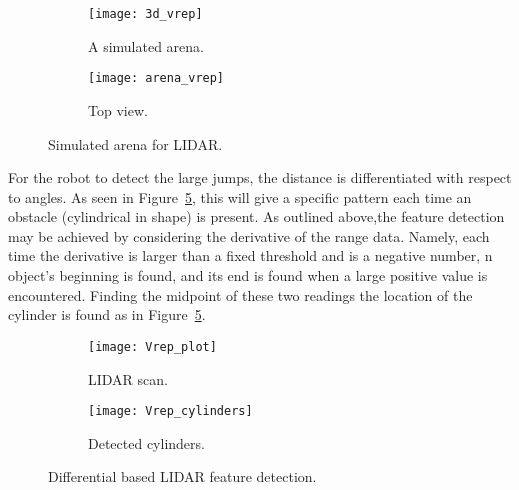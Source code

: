 \begin{figure}[h!]
    \centering
    \begin{subfigure}[b]{0.3\textwidth}
    
	    \texttt{[image: 3d\_vrep]}
	    \caption{A simulated arena.}
	    \label{fig:3d_vrep}
    \end{subfigure}
    \quad %
    \begin{subfigure}[b]{0.3\textwidth}
        \texttt{[image: arena\_vrep]}
        \caption{Top view.}
        \label{fig:arena_vrep}
    \end{subfigure}%
        \caption{Simulated arena for LIDAR.}
        \label{fig:Simulated_1}
\end{figure}

For the robot to detect the large jumps, the distance is differentiated with respect to angles. As seen in Figure~\ref{fig:Vrep_cylinders}, this will give a specific pattern each time an obstacle (cylindrical in shape) is present. As outlined above,the feature detection may be achieved by considering the derivative of the range data. Namely, each time the derivative is larger than a fixed threshold and is a negative number, n object's beginning is found, and its end is found when a large positive value is encountered. Finding the midpoint of these two readings the location of the cylinder is found as in Figure~\ref{fig:Vrep_cylinders}. 
\begin{figure}
        \centering

        \begin{subfigure}[b]{0.48\textwidth}
                \texttt{[image: Vrep\_plot]}
                \caption{LIDAR scan.}
                \label{fig:Vrep_plot}
        \end{subfigure}
        \quad
        \begin{subfigure}[b]{0.48\textwidth}
                \texttt{[image: Vrep\_cylinders]}
                \caption{Detected cylinders.}
                \label{fig:Vrep_cylinders}
        \end{subfigure}

        \caption{Differential based LIDAR feature detection.}
        \label{fig:Simulated_2}
\end{figure}

